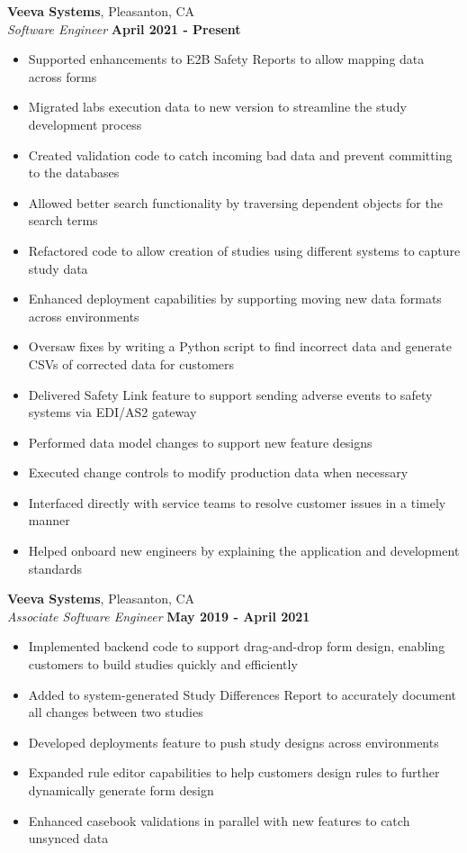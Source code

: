 \documentclass[margin,line]{resume}
\begin{document}
\begin{resume}
\textbf{Veeva Systems}, Pleasanton, CA \vspace{2mm}\\\vspace{1mm}
\textsl{Software Engineer} \hfill \textbf{April 2021 - Present} \vspace{2mm}
\begin{itemize} 
    \item Supported enhancements to E2B Safety Reports to allow mapping data across forms
    \item Migrated labs execution data to new version to streamline the study development process 
    \item Created validation code to catch incoming bad data and prevent committing to the databases 
    \item Allowed better search functionality by traversing dependent objects for the search terms
    \item Refactored code to allow creation of studies using different systems to capture study data
    \item Enhanced deployment capabilities by supporting moving new data formats across environments
    \item Oversaw fixes by writing a Python script to find incorrect data and generate CSVs of corrected data for customers 
    \item Delivered Safety Link feature to support sending adverse events to safety systems via EDI/AS2 gateway
    \item Performed data model changes to support new feature designs
    \item Executed change controls to modify production data when necessary
    \item Interfaced directly with service teams to resolve customer issues in a timely manner
    \item Helped onboard new engineers by explaining the application and development standards
\end{itemize}

\textbf{Veeva Systems}, Pleasanton, CA \vspace{2mm}\\\vspace{1mm}
\textsl{Associate Software Engineer} \hfill \textbf{May 2019 - April 2021} \vspace{2mm}
\begin{itemize}
    \item Implemented backend code to support drag-and-drop form design, enabling customers to build studies quickly and efficiently
    \item Added to system-generated Study Differences Report to accurately document all changes between two studies
    \item Developed deployments feature to push study designs across environments
    \item Expanded rule editor capabilities to help customers design rules to further dynamically generate form design
    \item Enhanced casebook validations in parallel with new features to catch unsynced data
\end{itemize}


\end{resume}
\end{document}
